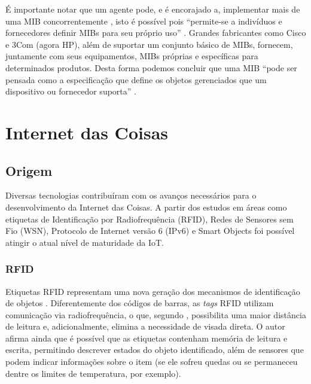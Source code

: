 \documentclass[twoside,english,brazilian]{UNISINOSmonografia}
\begin{document}
É importante notar que um agente pode, e é encorajado a, 
implementar mais de uma MIB concorrentemente 
\cite{Clemm2006}, 
isto é possível pois 
``permite-se a indivíduos e fornecedores definir MIBs para seu próprio uso'' 
\cite[p.~5]{Mauro2009}. 
Grandes fabricantes como Cisco e 3Com (agora HP), além de suportar um 
conjunto básico de MIBs, fornecem, juntamente com seus equipamentos, MIBs 
próprias e específicas para determinados produtos.
Desta forma podemos concluir que uma MIB 
``pode ser pensada como a especificação que define os objetos gerenciados que 
um dispositivo ou fornecedor suporta''
\cite[p.~27]{Mauro2009}.


\chapter{Internet das Coisas}


\section{Origem}

	Diversas tecnologias contribuíram com os avanços necessários para o 
	desenvolvimento da Internet das Coisas. A partir dos estudos em áreas como 
	etiquetas de Identificação por Radiofrequência (RFID), Redes de 
	Sensores sem Fio (WSN), Protocolo de Internet versão 6 (IPv6) e Smart 
	Objects foi possível atingir o atual nível de maturidade da IoT.



\subsection{RFID}
	Etiquetas RFID representam uma nova geração dos mecanismos de 
	identificação de objetos \cite{Brock2001}. Diferentemente dos códigos de 
	barras, as \textit{tags} RFID utilizam comunicação via radiofrequência, o 
	que, segundo , possibilita uma maior distância de 
	leitura e, adicionalmente, elimina a necessidade de visada direta. O autor 
	afirma ainda que é possível que as etiquetas contenham memória de leitura 
	e escrita, permitindo descrever estados do objeto identificado, além de 
	sensores que podem indicar informações sobre o item (se ele sofreu quedas 
	ou se permaneceu dentre os limites de temperatura, por exemplo).
	
\end{document}
